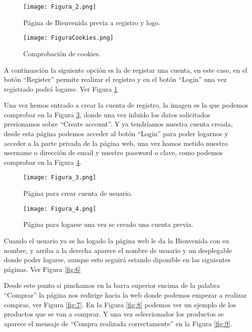 \documentclass{article}
\begin{document}
\begin{figure}[h]
\centering
\texttt{[image: Figura\_2.png]}
\caption{\label{fig:2}Página de Bienvenida previa a registro y logo.}
\end{figure}

\begin{figure}[h]
\centering
\texttt{[image: FiguraCookies.png]}
\caption{\label{fig:3}Comprobación de cookies.}
\end{figure}

A continuación la siguiente opción es la de registar una cuenta, en este caso, en el botón ``Register'' permite realizar el registro y en el botón ``Login'' una vez registrado podrá logarse. Ver Figura \ref{fig:2}

Una vez hemos entrado a crear la cuenta de registro, la imagen es la que podemos comprobar en la Figura \ref{fig:4}, donde una vez inluido los datos solicitados presionamos sobre ``Create account''. Y ya tendríamos nuestra cuenta creada, desde esta página podemos acceder al botón ``Login'' para poder logarnos y acceder a la parte privada de la página web, una vez hamos metido nuestro username o dirección de email y nuestro password o clave, como podemos comprobar en la Figura \ref{fig:5}.

\begin{figure}[h]
\centering
\texttt{[image: Figura\_3.png]}
\caption{\label{fig:4}Página para crear cuenta de usuario.}
\end{figure}

\begin{figure}[h]
\centering
\texttt{[image: Figura\_4.png]}
\caption{\label{fig:5}Página para logarse una vez se creado una cuenta previa.}
\end{figure}

Cuando el usuario ya se ha logado la página web le da la Bienvenida con su nombre, y arriba a la derecha aparece el nombre de usuario y un desplegable donde poder logarse, aunque esto seguirá estando diponible en las siguientes páginas. Ver Figura \ref{fig:6}

Desde este punto si pinchamos en la barra superior encima de la palabra ``Comprar'' la página nos redirige hacia la web donde podemos empezar a realizar compras, ver Figura \ref{fig:7}. En la Figura \ref{fig:8} podemos ver un ejemplo de los productos que se van a comprar. Y una vez seleccionados los productos se aparece el mensaje de ``Compra realizada correctamente'' en la Figura \ref{fig:9}.
\end{document}
